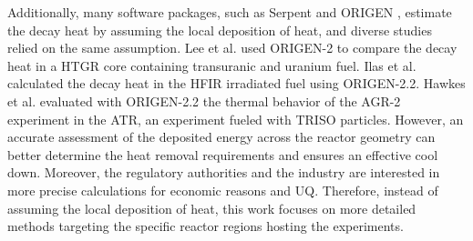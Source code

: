 Additionally, many software packages, such as Serpent \cite{giot_decay_2018} and ORIGEN \cite{scale}, estimate the decay heat by assuming the local deposition of heat, and diverse studies relied on the same assumption.
Lee et al. \cite{lee_decay_2010} used ORIGEN-2 to compare the decay heat in a \gls*{HTGR} core containing transuranic and uranium fuel.
Ilas et al. \cite{ilas_modeling_2015} calculated the decay heat in the HFIR irradiated fuel using ORIGEN-2.2.
Hawkes et al. \cite{hawkes_sensitivity_2015} evaluated with ORIGEN-2.2 the thermal behavior of the AGR-2 experiment in the ATR, an experiment fueled with \gls*{TRISO} particles.
However, an accurate assessment of the deposited energy across the reactor geometry can better determine the heat removal requirements and ensures an effective cool down.
Moreover, the regulatory authorities and the industry are interested in more precise calculations for economic reasons and \gls*{UQ}.
Therefore, instead of assuming the local deposition of heat, this work focuses on more detailed methods targeting the specific reactor regions hosting the experiments.


